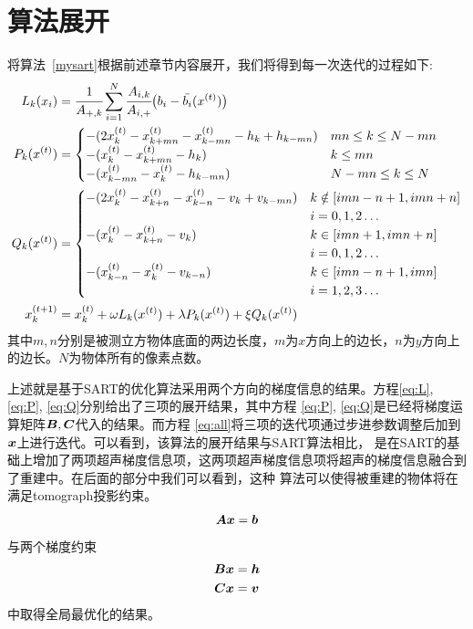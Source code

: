 \section{算法展开}\label{sec:algodetail}
将算法~\ref{mysart}根据前述章节内容展开，我们将得到每一次迭代的过程如下:
\begin{align}
 L_k(x_i) &= \cfrac{1}{A_{+,k}}\sum^N_{i=1}\cfrac{A_{i,k}}{A_{i,+}}\bigl(b_i-\bar{b_i}(x^{(t)})\bigr) \label{eq:L} \\
P_k(x^{(t)}) &= \begin{cases}
                            -(2x_k^{(t)} - x_{k+mn}^{(t)} - x_{k-mn}^{(t)} - h_k + h_{k-mn}) & mn \le k \le N-mn \\
                            -(x_k^{(t)} - x_{k+mn}^{(t)} - h_k) &  k\le mn \\
                            -(x_{k-mn}^{(t)} - x_{k}^{(t)} - h_{k-mn}) &  N-mn \le k \le N
                        \end{cases}  \label{eq:P} \\
Q_k(x^{(t)}) &= \begin{cases}
                            -(2x_k^{(t)} - x_{k+n}^{(t)} - x_{k-n}^{(t)} - v_k + v_{k-mn}) & k \notin [ imn-n+1, imn+n]
                            \\ &i = 0,1,2\hdots\\
                            -(x_k^{(t)} - x_{k+n}^{(t)} - v_k) & k \in \left[imn+1,imn+n\right] \\ &i = 0,1,2\hdots\\
                            -(x_{k-n}^{(t)} - x_{k}^{(t)} - v_{k-n}) &  k \in [imn-n+1,imn] \\ &i= 1,2,3 \hdots
                        \end{cases} \label{eq:Q} \\
x_k^{(t+1)}&= x_k^{(t)} + \omega L_k(x^{(t)}) + \lambda P_k(x^{(t)}) + \xi Q_k(x^{(t)}) \label{eq:all}
\end{align}
其中$m,n$分别是被测立方物体底面的两边长度，$m$为$x$方向上的边长，$n$为$y$方向上的边长。$N$为物体所有的像素点数。

上述就是基于SART的优化算法采用两个方向的梯度信息的结果。方程\eqref{eq:L}, \eqref{eq:P}, \eqref{eq:Q}分别给出了三项的展开结果，其中方程
\eqref{eq:P}, \eqref{eq:Q}是已经将梯度运算矩阵$\bm{B},\bm{C}$代入的结果。而方程
\eqref{eq:all}将三项的迭代项通过步进参数调整后加到$\bm{ x}$上进行迭代。可以看到，该算法的展开结果与SART算法相比，
是在SART的基础上增加了两项超声梯度信息项，这两项超声梯度信息项将超声的梯度信息融合到了重建中。在后面的部分中我们可以看到，这种
算法可以使得被重建的物体将在满足tomograph投影约束。
\begin{equation*}
\bm{A}\bm{ x} = \bm{b}
\end{equation*}
与两个梯度约束
\begin{align*}
\bm{B}\bm{ x} &= \bm{h} \\
\bm{C}\bm{ x} &= \bm{v}
\end{align*}
中取得全局最优化的结果。




